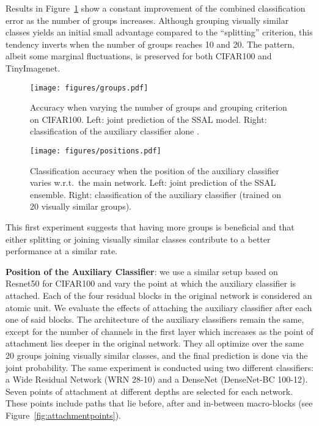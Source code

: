 \documentclass[10pt,twocolumn,letterpaper]{article}
\begin{document}
Results in Figure~\ref{fig:cifar100resnet10groups} show a constant improvement of the combined classification error as the number of groups increases.
Although grouping visually similar classes yields an initial small advantage compared to the ``splitting'' criterion, this tendency inverts when the number of groups reaches 10 and 20.
The pattern, albeit some marginal fluctuations, is preserved for both CIFAR100 and TinyImagenet.

\begin{figure}[t]
\centering
    \texttt{[image: figures/groups.pdf]}
	\caption{Accuracy when varying the number of groups and grouping criterion on CIFAR100. Left: joint prediction of the SSAL model. Right: classification of the auxiliary classifier alone  .}
	\label{fig:cifar100resnet10groups}
\end{figure}

\begin{figure}
\centering
    \texttt{[image: figures/positions.pdf]}
	\caption{Classification accuracy when the position of the auxiliary classifier varies w.r.t.~the main network. Left: joint prediction of the SSAL ensemble. Right: classification of the auxiliary classifier (trained on 20 visually similar groups).}
	\label{fig:cifar100postion}
\end{figure}

This first experiment suggests that having more groups is beneficial and that either splitting or joining visually similar classes contribute to a better performance at a similar rate.

\textbf{Position of the Auxiliary Classifier}: we use a similar setup based on Resnet50 for CIFAR100 and vary the point at which the auxiliary classifier is attached.
Each of the four residual blocks in the original network is considered an atomic unit.
We evaluate the effects of attaching the auxiliary classifier after each one of said blocks.
The architecture of the auxiliary classifiers remain the same, except for the number of channels in the first layer which increases as the point of attachment lies deeper in the original network.
They all optimize over the same 20 groups joining visually similar classes, and the final prediction is done via the joint probability.
The same experiment is conducted using two different classifiers: a Wide Residual Network (WRN 28-10) and a DenseNet (DenseNet-BC 100-12).
Seven points of attachment at different depths are selected for each network.
These points include paths that lie before, after and in-between macro-blocks (see Figure~\ref{fig:attachmentpoints}).
\end{document}
